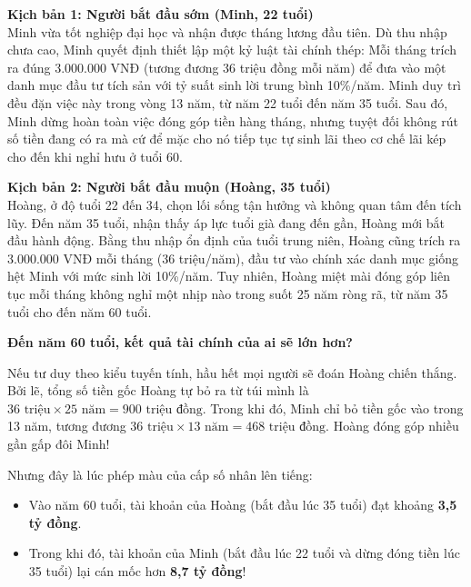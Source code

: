 \documentclass[14pt, a4paper, oneside]{extreport}
\begin{document}
\begin{tcolorbox}[colback=blue!5!white, colframe=blue!75!black, 
                  title=\textbf{So sánh lộ trình tích lũy}, arc=2mm]
\textbf{Kịch bản 1: Người bắt đầu sớm (Minh, 22 tuổi)}\\
Minh vừa tốt nghiệp đại học và nhận được tháng lương đầu tiên. Dù thu nhập chưa cao, Minh quyết định thiết lập một kỷ luật tài chính thép: Mỗi tháng trích ra đúng 3.000.000 VNĐ (tương đương 36 triệu đồng mỗi năm) để đưa vào một danh mục đầu tư tích sản với tỷ suất sinh lời trung bình 10\%/năm. Minh duy trì đều đặn việc này trong vòng 13 năm, từ năm 22 tuổi đến năm 35 tuổi. Sau đó, Minh dừng hoàn toàn việc đóng góp tiền hàng tháng, nhưng tuyệt đối không rút số tiền đang có ra mà cứ để mặc cho nó tiếp tục tự sinh lãi theo cơ chế lãi kép cho đến khi nghỉ hưu ở tuổi 60.

\vspace{0.3cm}
\textbf{Kịch bản 2: Người bắt đầu muộn (Hoàng, 35 tuổi)}\\
Hoàng, ở độ tuổi 22 đến 34, chọn lối sống tận hưởng và không quan tâm đến tích lũy. Đến năm 35 tuổi, nhận thấy áp lực tuổi già đang đến gần, Hoàng mới bắt đầu hành động. Bằng thu nhập ổn định của tuổi trung niên, Hoàng cũng trích ra 3.000.000 VNĐ mỗi tháng (36 triệu/năm), đầu tư vào chính xác danh mục giống hệt Minh với mức sinh lời 10\%/năm. Tuy nhiên, Hoàng miệt mài đóng góp liên tục mỗi tháng không nghỉ một nhịp nào trong suốt 25 năm ròng rã, từ năm 35 tuổi cho đến năm 60 tuổi.
\end{tcolorbox}

\textbf{Đến năm 60 tuổi, kết quả tài chính của ai sẽ lớn hơn?}

Nếu tư duy theo kiểu tuyến tính, hầu hết mọi người sẽ đoán Hoàng chiến thắng. Bởi lẽ, tổng số tiền gốc Hoàng tự bỏ ra từ túi mình là $36 \text{ triệu} \times 25 \text{ năm} = 900 \text{ triệu đồng}$. Trong khi đó, Minh chỉ bỏ tiền gốc vào trong 13 năm, tương đương $36 \text{ triệu} \times 13 \text{ năm} = 468 \text{ triệu đồng}$. Hoàng đóng góp nhiều gần gấp đôi Minh!

Nhưng đây là lúc phép màu của cấp số nhân lên tiếng:
\begin{itemize}
    \item Vào năm 60 tuổi, tài khoản của Hoàng (bắt đầu lúc 35 tuổi) đạt khoảng \textbf{3,5 tỷ đồng}. 
    \item Trong khi đó, tài khoản của Minh (bắt đầu lúc 22 tuổi và dừng đóng tiền lúc 35 tuổi) lại cán mốc hơn \textbf{8,7 tỷ đồng}!
\end{itemize}
\end{document}
